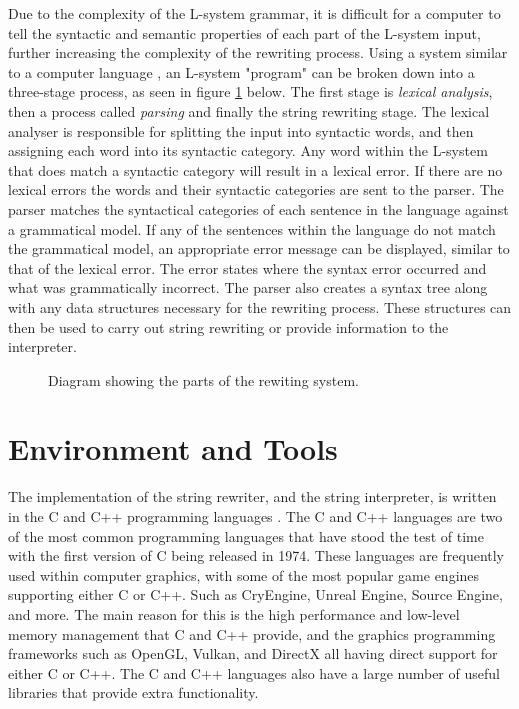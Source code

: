 Due to the complexity of the L-system grammar, it is difficult for a computer to tell the syntactic and semantic properties of each part of the L-system input, further increasing the complexity of the rewriting process. Using a system similar to a computer language , an L-system "program" can be broken down into a three-stage process, as seen in figure \ref{rewriting system} below. The first stage is \textit{lexical analysis}, then a process called \textit{parsing} and finally the string rewriting stage. The lexical analyser is responsible for splitting the input into syntactic words, and then assigning each word into its syntactic category. Any word within the L-system that does match a syntactic category will result in a lexical error. If there are no lexical errors the words and their syntactic categories are sent to the parser. The parser matches the syntactical categories of each sentence in the language against a grammatical model. If any of the sentences within the language do not match the grammatical model, an appropriate error message can be displayed, similar to that of the lexical error. The error states where the syntax error occurred and what was grammatically incorrect. The parser also creates a syntax tree along with any data structures necessary for the rewriting process. These structures can then be used to carry out string rewriting or provide information to the interpreter.

\begin{figure}[htbp]
	{\centering
		\setlength{\fboxrule}{1pt}
		\vspace{7px}
		\caption{Diagram showing the parts of the rewiting system.} \label{rewriting system}
	}
\end{figure}
\FloatBarrier

\section{Environment and Tools}

The implementation of the string rewriter, and the string interpreter, is written in the C and C++ programming languages \cite{stroustrup2000c++}. The C and C++ languages are two of the most common programming languages that have stood the test of time with the first version of C being released in 1974. These languages are frequently used within computer graphics, with some of the most popular game engines supporting either C or C++. Such as CryEngine, Unreal Engine, Source Engine, and more. The main reason for this is the high performance and low-level memory management that C and C++ provide, and the graphics programming frameworks such as OpenGL, Vulkan, and DirectX all having direct support for either C or C++. The C and C++ languages also have a large number of useful libraries that provide extra functionality.  

